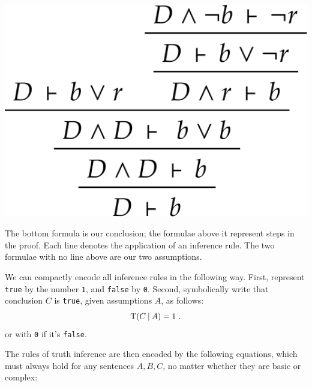\documentclass[
  a4paper,
  DIV=11,
  numbers=noendperiod,
  oneside]{scrreprt}
\begin{document}
\begin{marginfigure}

{\centering \includegraphics[width=1\textwidth,height=\textheight]{umbrella_inference_sequent.png}

}

\caption{The bottom formula is our conclusion; the formulae above it
represent steps in the proof. Each line denotes the application of an
inference rule. The two formulae with no line above are our two
assumptions.}

\end{marginfigure}

\hfill\break

We can compactly encode all inference rules in the following way. First,
represent \texttt{true} by the number \texttt{1}, and \texttt{false} by
\texttt{0}. Second, symbolically write that conclusion \(C\) is
\texttt{true}, given assumptions \(A\), as follows: \[
\mathrm{T}(C \nonscript\:\vert\nonscript\:\mathopen{} A) = 1 \ .
\] or with \texttt{0} if it's \texttt{false}.

The rules of truth inference are then encoded by the following
equations, which must always hold for any sentences \(A,B,C\), no matter
whether they are basic or complex:
\end{document}
